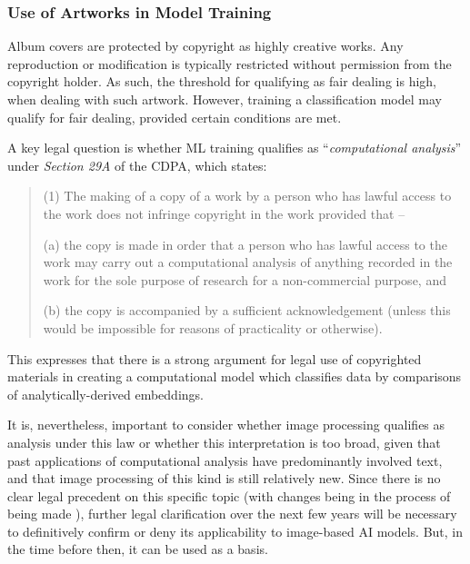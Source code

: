               \subsubsection{Use of Artworks in Model Training}
              
                  Album covers are protected by copyright as highly creative works. Any reproduction or modification is typically restricted without permission from the copyright holder. As such, the threshold for qualifying as fair dealing is high, when dealing with such artwork. However, training a classification model may qualify for fair dealing, provided certain conditions are met.
    
                  A key legal question is whether ML training qualifies as ``\textit{computational analysis}'' under \textit{Section 29A} of the CDPA, which states:
                  \begin{quote}
                      (1) The making of a copy of a work by a person who has lawful access to the work does not infringe copyright in the work provided that --
                  
                          (a) the copy is made in order that a person who has lawful access to the work may carry out a computational analysis of anything recorded in the work for the sole purpose of research for a non-commercial purpose, and
                          
                          (b) the copy is accompanied by a sufficient acknowledgement (unless this would be impossible for reasons of practicality or otherwise). \cite{cdpa1988}
                  \end{quote}
    
                  This expresses that there is a strong argument for legal use of copyrighted materials in creating a computational model which classifies data by comparisons of analytically-derived embeddings.
    
                  It is, nevertheless, important to consider whether image processing qualifies as analysis under this law or whether this interpretation is too broad, given that past applications of computational analysis have predominantly involved text, and that image processing of this kind is still relatively new. Since there is no clear legal precedent on this specific topic (with changes being in the process of being made \cite{guardian2024uk_ai_copyright}), further legal clarification over the next few years will be necessary to definitively confirm or deny its applicability to image-based AI models. But, in the time before then, it can be used as a basis.
    
